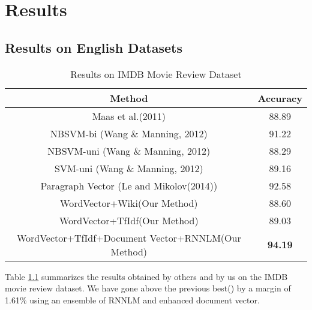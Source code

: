 \chapter{Results}
\label{sec:result}
\section{Results on English Datasets}

\begin {table}[h!]
\centering
\begin{tabular}{ | c | c | }
\hline
\textbf{Method} & \textbf{Accuracy} \\ \hline
Maas et al.(2011) & 88.89\\ \hline
NBSVM-bi (Wang \& Manning, 2012) & 91.22\\ \hline
NBSVM-uni (Wang \& Manning, 2012) & 88.29\\ \hline
SVM-uni (Wang \& Manning, 2012) & 89.16\\ \hline
Paragraph Vector (Le and Mikolov(2014)) & 92.58\\ \hline
WordVector+Wiki(Our Method) & 88.60\\ \hline
WordVector+TfIdf(Our Method) & 89.03\\ \hline
WordVector+TfIdf+Document Vector+RNNLM(Our Method) & \textbf{94.19}\\ \hline
\end{tabular}
\caption {Results on IMDB Movie Review Dataset}
\label{table:IMDB}
\end{table}

Table \ref{table:IMDB} summarizes the results obtained by others and by us on the IMDB movie review dataset. We have gone above the previous best(\cite{Le:14}) by a margin of 1.61\% using an ensemble of RNNLM and enhanced document vector.

